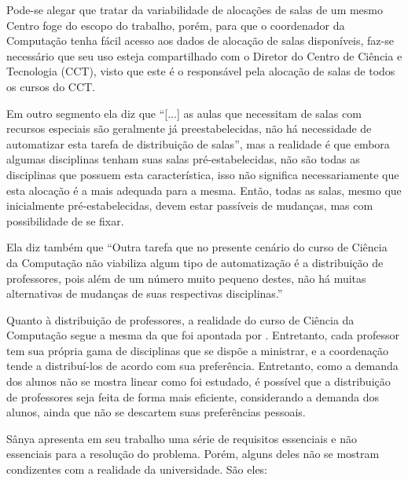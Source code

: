 Pode-se alegar que tratar da variabilidade de alocações de salas de um mesmo Centro foge do escopo do trabalho, porém, para que o coordenador da Computação tenha fácil acesso aos dados de alocação de salas disponíveis, faz-se necessário que seu uso esteja compartilhado com o Diretor do Centro de Ciência e Tecnologia (CCT), visto que este é o responsável pela alocação de salas de todos os cursos do CCT.

Em outro segmento ela diz que ``[...] as aulas que necessitam de salas com recursos especiais são geralmente já preestabelecidas, não há necessidade de automatizar esta tarefa de distribuição de salas'', mas a realidade é que embora algumas disciplinas tenham suas salas pré-estabelecidas, não são todas as disciplinas que possuem esta característica, isso não significa necessariamente que esta alocação é a mais adequada para a mesma. Então, todas as salas, mesmo que inicialmente pré-estabelecidas, devem estar passíveis de mudanças, mas com possibilidade de se fixar.

Ela diz também que ``Outra tarefa que no presente cenário do curso de Ciência da Computação não viabiliza algum tipo de automatização é a distribuição de professores, pois além de um número muito pequeno destes, não há muitas alternativas de mudanças de suas respectivas disciplinas.''

Quanto à distribuição de professores, a realidade do curso de Ciência da Computação segue a mesma da que foi apontada por . Entretanto, cada professor tem sua própria gama de disciplinas que se dispõe a ministrar, e a coordenação tende a distribuí-los de acordo com sua preferência. Entretanto, como a demanda dos alunos não se mostra linear como foi estudado, é possível que a distribuição de professores seja feita de forma mais eficiente, considerando a demanda dos alunos, ainda que não se descartem suas preferências pessoais.

Sânya apresenta em seu trabalho uma série de requisitos essenciais e não essenciais para a resolução do problema. Porém, alguns deles não se mostram condizentes com a realidade da universidade. São eles:

